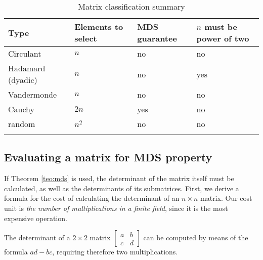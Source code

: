 \begin{footnotesize}
\begin{longtable}{|l|l|l|l|}
\hline
\textbf{Type}     & \textbf{Elements to select} & \textbf{MDS guarantee} & \textbf{$n$ must be power of two} \\ \hline
\endfirsthead
%
\endhead
%
Circulant         & $n$                              & no                              & no                                       \\ \hline
Hadamard (dyadic) & $n$                              & no                              & yes                                      \\ \hline
Vandermonde       & $n$                              & no                              & no                                       \\ \hline
Cauchy            & $2n$                             & yes                             & no                                       \\ \hline
random            & $n^2$                             & no                            & no                                       \\ \hline
\caption{Matrix classification summary}
\label{tab:matrix-types}\\
\end{longtable}
\end{footnotesize}

\subsection{Evaluating a matrix for MDS property}
If Theorem \ref{teo:mds} is used, the determinant of the matrix itself must be calculated, as well as the determinants of its submatrices. First, we derive a formula for the cost of calculating the determinant of an $n \times n$ matrix. Our cost unit is \emph{the number of multiplications in a finite field}, since it is the most expensive operation.

The determinant of a  $2 \times 2$ matrix $\begin{bmatrix}a & b \\ c & d\end{bmatrix}$ can be computed by means of the formula $ad - bc$, requiring therefore two multiplications.

